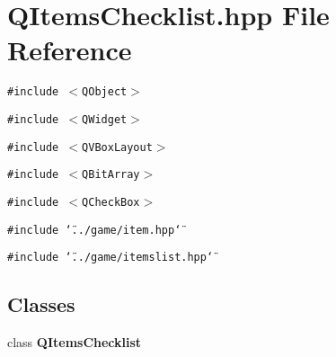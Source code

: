 \section{QItems\-Checklist.hpp File Reference}
\label{QItemsChecklist_8hpp}
{\tt \#include $<$QObject$>$}\par
{\tt \#include $<$QWidget$>$}\par
{\tt \#include $<$QVBox\-Layout$>$}\par
{\tt \#include $<$QBit\-Array$>$}\par
{\tt \#include $<$QCheck\-Box$>$}\par
{\tt \#include \char`\"{}../game/item.hpp\char`\"{}}\par
{\tt \#include \char`\"{}../game/itemslist.hpp\char`\"{}}\par
\subsection*{Classes}
\begin{CompactItemize}
\item 
class {\bf QItems\-Checklist}
\end{CompactItemize}
